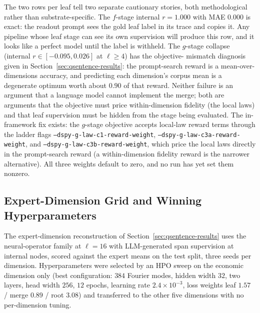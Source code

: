 The two rows per leaf tell two separate cautionary stories, both
methodological rather than substrate-specific. The $f$-stage internal
$r = 1.000$ with MAE $0.000$ is exact: the readout prompt sees the gold
leaf label in its trace and copies it. Any pipeline whose leaf stage
can see its own supervision will produce this row, and it looks like a
perfect model until the label is withheld. The $g$-stage collapse
(internal $r \in [-0.095, 0.026]$ at $\ell \geq 4$) has the objective-
mismatch diagnosis given in Section~\ref{sec:qsentence-results}: the
prompt-search reward is a mean-over-dimensions accuracy, and
predicting each dimension's corpus mean is a degenerate optimum worth
about $0.90$ of that reward. Neither failure is an argument that a
language model cannot implement the merge; both are arguments that the
objective must price within-dimension fidelity (the local laws) and
that leaf supervision must be hidden from the stage being evaluated.
The in-framework fix exists: the $g$-stage objective accepts local-law
reward terms through the ladder flags
\texttt{--dspy-g-law-c1-reward-weight},
\texttt{--dspy-g-law-c3a-reward-weight}, and
\texttt{--dspy-g-law-c3b-reward-weight}, which price the local laws
directly in the prompt-search reward (a within-dimension fidelity
reward is the narrower alternative). All three weights default to
zero, and no run has yet set them nonzero.

\subsection{Expert-Dimension Grid and Winning Hyperparameters}

The expert-dimension reconstruction of
Section~\ref{sec:qsentence-results} uses the neural-operator family at
$\ell = 16$ with LLM-generated span supervision at internal nodes,
scored against the \citet{BenoitEtAl2025} expert means on the test
split, three seeds per dimension. Hyperparameters were selected by an
HPO sweep on the economic dimension only
(best configuration: $384$ Fourier modes, hidden width $32$, two
layers, head width $256$, $12$ epochs, learning rate
$2.4\times10^{-3}$, loss weights leaf $1.57$ / merge $0.89$ / root
$3.08$) and transferred to the other five dimensions with no
per-dimension tuning.

